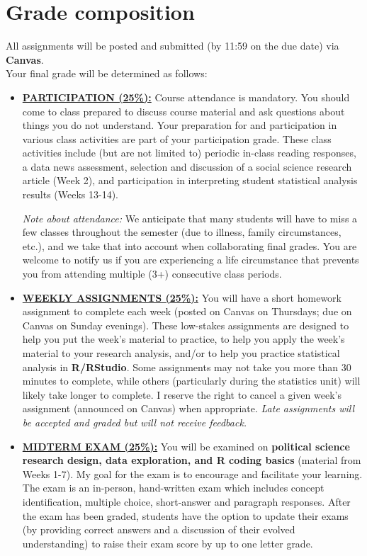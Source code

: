 \documentclass[11pt]{article}
\begin{document}
\section*{Grade composition}

All assignments will be posted and submitted (by 11:59 on the due date) via \textbf{Canvas}. \\

\noindent Your final grade will be determined as follows:
\begin{itemize}
	\item \underline{\textbf{PARTICIPATION (25\%):}} Course attendance is mandatory. You should come to class prepared to discuss course material and ask questions about things you do not understand.
    Your preparation for and participation in various class activities are part of your participation grade. These class activities include (but are not limited to) periodic in-class reading responses, a data news assessment, selection and discussion of a social science research article (Week 2), and participation in interpreting student statistical analysis results (Weeks 13-14).

   \textit{Note about attendance:} We anticipate that many students will have to miss a few classes throughout the semester (due to illness, family circumstances, etc.), and we take that into account when collaborating final grades. You are welcome to notify us if you are experiencing a life circumstance that prevents you from attending multiple (3+) consecutive class periods.

	\item \underline{\textbf{WEEKLY ASSIGNMENTS (25\%):}} You will have a  short homework assignment to complete each week (posted on Canvas on Thursdays; due on Canvas on Sunday evenings). These low-stakes assignments are designed to help you put the week's material to practice, to help you apply the week's material to your research analysis, and/or to help you practice statistical analysis in \textbf{\textsf{R/RStudio}}. Some assignments may not take you more than 30 minutes to complete, while others (particularly during the statistics unit) will likely take longer to complete. I reserve the right to cancel a given week's assignment (announced on Canvas) when appropriate.
    \textit{Late assignments will be accepted and graded but will not receive feedback.}

    \item \underline{\textbf{MIDTERM EXAM (25\%):}} You will be examined on \textbf{political science research design, data exploration, and \textsf{R} coding basics} (material from Weeks 1-7). My goal for the exam is to encourage and facilitate your learning. The exam is an in-person, hand-written exam which includes concept identification, multiple choice, short-answer and paragraph responses.
    After the exam has been graded, students have the option to update their exams (by providing correct answers and a discussion of their evolved understanding) to raise their exam score by up to one letter grade.


\end{itemize}
\end{document}
